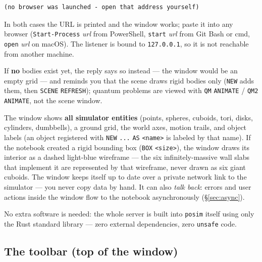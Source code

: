 \documentclass[11pt]{article}
\newcommand{\kw}[1]{\texttt{\uppercase{#1}}}
\newcommand{\code}[1]{\texttt{#1}}
\begin{document}
\begin{lstlisting}
(no browser was launched - open that address yourself)
\end{lstlisting}

In both cases the URL is printed and the window works; paste it into any
browser (\code{Start-Process} \textit{url} from PowerShell,
\code{start} \textit{url} from Git Bash or cmd, \code{open} \textit{url}
on macOS). The listener is bound to \texttt{127.0.0.1}, so it is not
reachable from another machine.

If \textbf{no} bodies exist yet, the reply says so instead --- the
window would be an empty grid --- and reminds you that the scene draws
rigid bodies only (\kw{new} adds them, then \kw{scene} \kw{refresh});
quantum problems are viewed with \kw{qm} \kw{animate} /
\kw{qm2} \kw{animate}, not the scene window.

The window shows \textbf{all simulator entities} (points, spheres,
cuboids, tori, disks, cylinders, dumbbells), a ground grid, the world
axes, motion trails, and object labels (an object registered with
\kw{new} \code{...} \kw{as} \code{<name>} is labeled by that name).
If the notebook created a rigid
bounding box (\kw{box} \code{<size>}), the window draws its interior
as a dashed light-blue wireframe --- the six infinitely-massive wall
slabs that implement it are represented by that wireframe, never
drawn as six giant cuboids. The window keeps itself up to date over a
private network link to the simulator --- you never copy data by
hand. It can also \emph{talk back}: errors and user actions inside
the window flow to the notebook asynchronously (\S\ref{sec:async}).

No extra software is needed: the whole server is built into
\code{posim} itself using only the Rust standard library --- zero
external dependencies, zero \code{unsafe} code.

\subsection{The toolbar (top of the window)}
\end{document}
